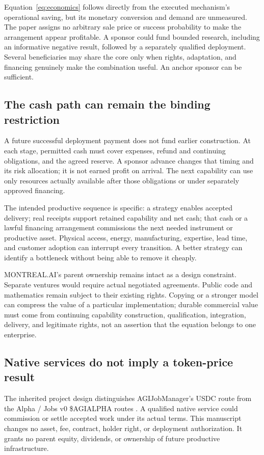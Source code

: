 \documentclass[11pt,letterpaper]{article}
\theoremstyle{remark}\newtheorem{remark}{Remark}[section]
\begin{document}
Equation~\eqref{eq:economics} follows directly from the executed mechanism's operational saving, but its monetary conversion and demand are unmeasured. The paper assigns no arbitrary sale price or success probability to make the arrangement appear profitable. A sponsor could fund bounded research, including an informative negative result, followed by a separately qualified deployment. Several beneficiaries may share the core only when rights, adaptation, and financing genuinely make the combination useful. An anchor sponsor can be sufficient.

\subsection{The cash path can remain the binding restriction}
A future successful deployment payment does not fund earlier construction. At each stage, permitted cash must cover expenses, refund and continuing obligations, and the agreed reserve. A sponsor advance changes that timing and its risk allocation; it is not earned profit on arrival. The next capability can use only resources actually available after those obligations or under separately approved financing.

The intended productive sequence is specific: a strategy enables accepted delivery; real receipts support retained capability and net cash; that cash or a lawful financing arrangement commissions the next needed instrument or productive asset. Physical access, energy, manufacturing, expertise, lead time, and customer adoption can interrupt every transition. A better strategy can identify a bottleneck without being able to remove it cheaply.

MONTREAL.AI's parent ownership remains intact as a design constraint. Separate ventures would require actual negotiated agreements. Public code and mathematics remain subject to their existing rights. Copying or a stronger model can compress the value of a particular implementation; durable commercial value must come from continuing capability construction, qualification, integration, delivery, and legitimate rights, not an assertion that the equation belongs to one enterprise.

\subsection{Native services do not imply a token-price result}
The inherited project design distinguishes AGIJobManager's USDC route from the Alpha / Jobs v0 \$AGIALPHA routes \citep{boucherEconomy,boucherExperiment}. A qualified native service could commission or settle accepted work under its actual terms. This manuscript changes no asset, fee, contract, holder right, or deployment authorization. It grants no parent equity, dividends, or ownership of future productive infrastructure.
\end{document}
